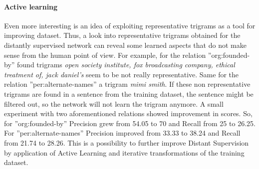 \paragraph{Active learning}
\label{par:active-learn}
Even more interesting is an idea of exploiting representative trigrams as a tool for improving dataset. Thus, a look into 
representative trigrams obtained for the distantly supervised network can reveal some learned aspects that 
do not make sense from the human point of view. For example, for the relation ''org:founded-by'' found trigrams 
\textit{open society institute, fox broadcasting company, ethical treatment of, jack daniel's} seem to be 
not really representative. Same for the relation ''per:alternate-names'' a trigram \textit{mimi smith}. If these 
non representative trigrams are found in a sentence from the training dataset, the sentence might be 
filtered out, so the network will not learn the trigram anymore. A small experiment with two aforementioned 
relations showed improvement in scores. So, for ''org:founded-by'' Precision grew from 54.05 to 70 and 
Recall from 25 to 26.25. For ''per:alternate-names'' Precision improved from 33.33 to 38.24 and Recall 
from 21.74 to 28.26. This is a possibility to further improve Distant Supervision by application of Active Learning and iterative
transformations of the training dataset.
 

